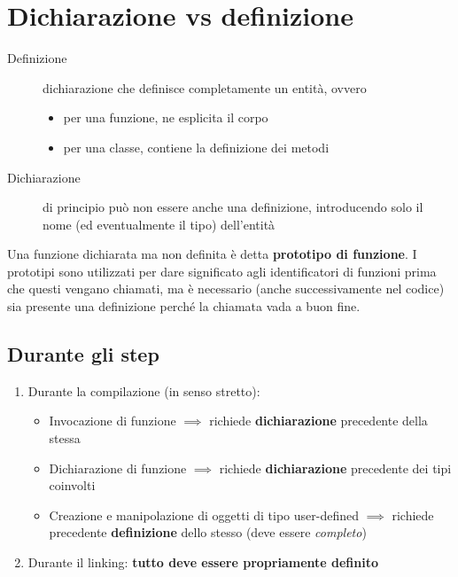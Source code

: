 \documentclass[10pt, oneside]{book}
\begin{document}
\section{Dichiarazione vs definizione}
\begin{description}
\item[Definizione] dichiarazione che definisce completamente un entità, ovvero
\begin{itemize}
\item per una funzione, ne esplicita il corpo
\item per una classe, contiene la definizione dei metodi
\end{itemize}
\item[Dichiarazione] di principio può non essere anche una definizione, introducendo solo il nome (ed eventualmente il tipo) dell'entità
\end{description}
Una funzione dichiarata ma non definita è detta \textbf{prototipo di funzione}. I prototipi sono utilizzati per dare significato agli identificatori di funzioni prima che questi vengano chiamati, ma è necessario (anche successivamente nel codice) sia presente una definizione perché la chiamata vada a buon fine.

\subsection{Durante gli step}
\begin{enumerate}
\item Durante la compilazione (in senso stretto):
\begin{itemize}
\item Invocazione di funzione $\implies$ richiede \textbf{dichiarazione} precedente della stessa
\item Dichiarazione di funzione $\implies$ richiede \textbf{dichiarazione} precedente dei tipi coinvolti
\item Creazione e manipolazione di oggetti di tipo user-defined $\implies$ richiede precedente \textbf{definizione} dello stesso (deve essere \textit{completo})
\end{itemize}
\item Durante il linking: \textbf{tutto deve essere propriamente definito}
\end{enumerate}
\end{document}
